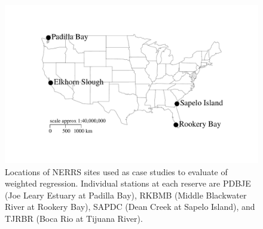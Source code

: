 \documentclass[letterpaper,12pt,oneside]{article}\usepackage[]{graphicx}\usepackage[]{color}
\makeatletter
\def\maxwidth{ %
  \ifdim\Gin@nat@width>\linewidth
    \linewidth
  \else
    \Gin@nat@width
  \fi
}
\newenvironment{knitrout}{}{} %
\makeatother
\begin{document}
\centering\vspace*{\fill}
\begin{knitrout}
\color{fgcolor}\begin{figure}[!ht]


{\centering \includegraphics[width=\maxwidth]{figure/case_map} 

}

\caption[Locations of \ac{NERRS} sites used as case studies to evaluate of weighted regression]{Locations of \ac{NERRS} sites used as case studies to evaluate of weighted regression.  Individual stations at each reserve are PDBJE (Joe Leary Estuary at Padilla Bay), RKBMB (Middle Blackwater River at Rookery Bay), SAPDC (Dean Creek at Sapelo Island), and TJRBR (Boca Rio at Tijuana River).\label{fig:case_map}}
\end{figure}


\end{knitrout}
\vfill
\clearpage

\end{document}
